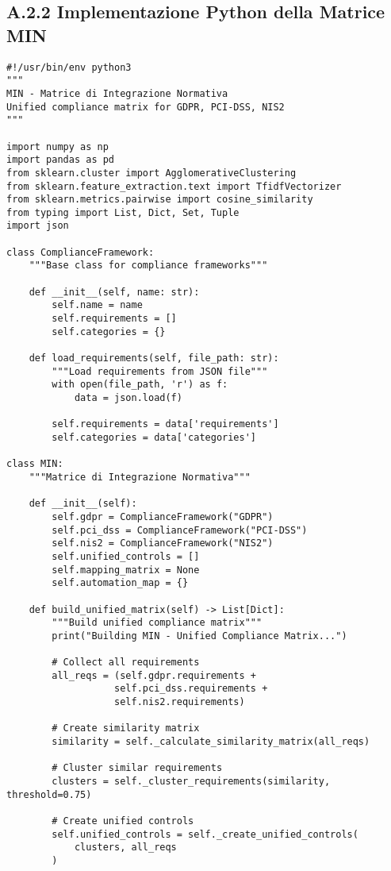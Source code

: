 \subsection{A.2.2 Implementazione Python della Matrice MIN}

\begin{verbatim}
#!/usr/bin/env python3
"""
MIN - Matrice di Integrazione Normativa
Unified compliance matrix for GDPR, PCI-DSS, NIS2
"""

import numpy as np
import pandas as pd
from sklearn.cluster import AgglomerativeClustering
from sklearn.feature_extraction.text import TfidfVectorizer
from sklearn.metrics.pairwise import cosine_similarity
from typing import List, Dict, Set, Tuple
import json

class ComplianceFramework:
    """Base class for compliance frameworks"""
    
    def __init__(self, name: str):
        self.name = name
        self.requirements = []
        self.categories = {}
    
    def load_requirements(self, file_path: str):
        """Load requirements from JSON file"""
        with open(file_path, 'r') as f:
            data = json.load(f)
        
        self.requirements = data['requirements']
        self.categories = data['categories']

class MIN:
    """Matrice di Integrazione Normativa"""
    
    def __init__(self):
        self.gdpr = ComplianceFramework("GDPR")
        self.pci_dss = ComplianceFramework("PCI-DSS")
        self.nis2 = ComplianceFramework("NIS2")
        self.unified_controls = []
        self.mapping_matrix = None
        self.automation_map = {}
    
    def build_unified_matrix(self) -> List[Dict]:
        """Build unified compliance matrix"""
        print("Building MIN - Unified Compliance Matrix...")
        
        # Collect all requirements
        all_reqs = (self.gdpr.requirements + 
                   self.pci_dss.requirements + 
                   self.nis2.requirements)
        
        # Create similarity matrix
        similarity = self._calculate_similarity_matrix(all_reqs)
        
        # Cluster similar requirements
        clusters = self._cluster_requirements(similarity, threshold=0.75)
        
        # Create unified controls
        self.unified_controls = self._create_unified_controls(
            clusters, all_reqs
        )
        

\end{verbatim}
